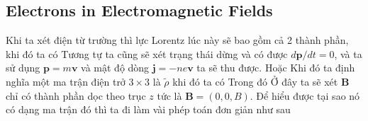 \subsection{Electrons in Electromagnetic Fields}
Khi ta xét điện từ trường thì lực Lorentz lúc này sẽ bao gồm cả 2 thành phần, khi đó ta có 
Tương tự ta cũng sẽ xét trạng thái dừng và có được $d\mathbf{p}/dt = 0$, và ta sử dụng $\mathbf{p} = m\mathbf{v}$ và mật độ dòng $\mathbf{j} = -ne\mathbf{v}$ ta sẽ thu được.
Hoặc 
Khi đó ta định nghĩa một ma trận điện trở $3\times 3$ là $\tilde{\rho}$ khi đó ta có
Trong đó 
Ở đây ta sẽ xét $\mathbf{B}$ chỉ có thành phần dọc theo trục $z$ tức là $\mathbf{B} = (0,0,B)$. Để hiểu được tại sao nó có dạng ma trận đó thì ta đi làm vài phép toán đơn giản như sau
